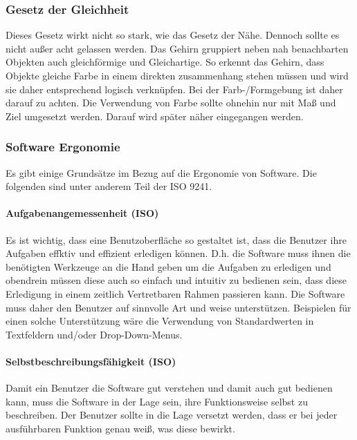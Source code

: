 \subsubsection{Gesetz der Gleichheit}

Dieses Gesetz wirkt nicht so stark, wie das Gesetz der Nähe. Dennoch sollte es
nicht außer acht gelassen werden. Das Gehirn gruppiert neben nah benachbarten
Objekten auch gleichförmige und Gleichartige. So erkennt das Gehirn, dass
Objekte gleiche Farbe in einem direkten zusammenhang stehen müssen und wird sie
daher entsprechend logisch verknüpfen. Bei der Farb-/Formgebung ist daher darauf
zu achten. Die Verwendung von Farbe sollte ohnehin nur mit Maß und Ziel
umgesetzt werden. Darauf wird später näher eingegangen werden.

\subsubsection{Software Ergonomie}

Es gibt einige Grundsätze im Bezug auf die Ergonomie von Software. Die folgenden
sind unter anderem Teil der ISO 9241. 

\paragraph{Aufgabenangemessenheit (ISO)}

Es ist wichtig, dass eine Benutzoberfläche so gestaltet ist, dass die Benutzer
ihre Aufgaben effktiv und effizient erledigen können. D.h. die Software muss
ihnen die benötigten Werkzeuge an die Hand geben um die Aufgaben zu erledigen 
und obendrein müssen diese auch so einfach und intuitiv zu bedienen sein, dass
diese Erledigung in einem zeitlich Vertretbaren Rahmen passieren kann. Die
Software muss daher den Benutzer auf sinnvolle Art und weise unterstützen.
Beispielen für einen solche Unterstützung wäre die Verwendung von Standardwerten
in Textfeldern und/oder Drop-Down-Menus. 

\paragraph{Selbstbeschreibungsfähigkeit (ISO)}

Damit ein Benutzer die Software gut verstehen und damit auch gut bedienen kann,
muss die Software in der Lage sein, ihre Funktionsweise selbst zu beschreiben.
Der Benutzer sollte in die Lage versetzt werden, dass er bei jeder ausführbaren
Funktion genau weiß, was diese bewirkt.

